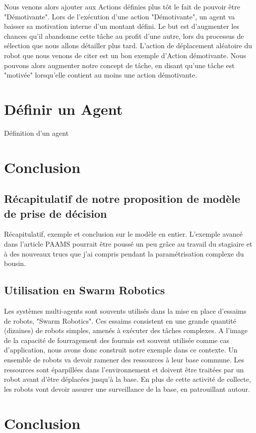 \documentclass[11pt,a4paper]{report}
\begin{document}
			Nous venons alors ajouter aux Actions définies plus tôt le fait de pouvoir être "Démotivante". Lors de l'exécution d'une action "Démotivante", un agent va baisser sa motivation interne d'un montant défini. Le but est d'augmenter les chances qu'il abandonne cette tâche au profit d'une autre, lors du processus de sélection que nous allons détailler plus tard. L'action de déplacement aléatoire du robot que nous venons de citer est un bon exemple d'Action démotivante. Nous pouvons alors augmenter notre concept de tâche, en disant qu'une tâche est "motivée" lorsqu'elle contient au moins une action démotivante.
	
	\section{Définir un Agent}
		Définition d'un agent
		
	\section{Conclusion}
		\subsection{Récapitulatif de notre proposition de modèle de prise de décision}
		Récapitulatif, exemple et conclusion sur le modèle en entier.
		L'exemple avancé dans l'article PAAMS pourrait être poussé un peu grâce au travail du stagiaire et à des nouveaux trucs que j'ai compris pendant la paramétrisation complexe du bousin.
		
		\subsection{Utilisation en Swarm Robotics}
			Les systèmes multi-agents sont souvents utilisés dans la mise en place d'essaims de robots, "Swarm Robotics". Ces essaims consistent en une grande quantité (dizaines) de robots simples, amenés à exécuter des tâches complexes. A l'image de la capacité de fourragement des fourmis est souvent utilisée comme cas d'application, nous avons donc construit notre exemple dans ce contexte. Un ensemble de robots va devoir ramener des ressources à leur base commune. Les ressources sont éparpillées dans l'environnement et doivent être traitées par un robot avant d'être déplacées jusqu'à la base. En plus de cette activité de collecte, les robots vont devoir assurer une surveillance de la base, en patrouillant autour.
			
	\section*{Conclusion}
\end{document}
